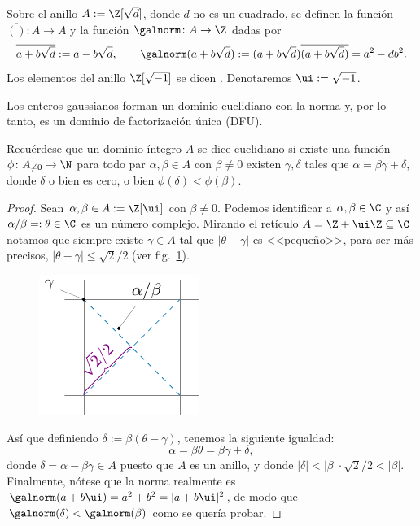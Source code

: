 \documentclass[11pt, reqno]{amsart}
\begin{document}
\begin{mydef}
	Sobre el anillo $A := \Z[\sqrt{d}]$, donde $d$ no es un cuadrado, se definen la función  $\overline{()} \colon A \to A$
	y la función  $\galnorm\colon A \to \Z$ dadas por
	\[
		\overline{a + b\sqrt{d}} := a - b\sqrt{d}, \qquad \galnorm(a + b\sqrt{d}) := (a + b\sqrt{d}) \overline{(a + b\sqrt{d})} = a^2 - db^2.
	\]
	Los elementos del anillo $\Z[\sqrt{-1}]$ se dicen .
	Denotaremos $\ui := \sqrt{-1}$.
\end{mydef}
\begin{thm}\label{thm:gauss_is_euclid}
	Los enteros gaussianos forman un dominio euclidiano con la norma y, por lo tanto, es un dominio de factorización única (DFU).
\end{thm}
Recuérdese que un dominio íntegro $A$ se dice euclidiano si existe una función $\phi \colon A_{\ne 0} \to \N$ para todo par $\alpha, \beta \in A$
con $\beta \ne 0$ existen $\gamma, \delta$ tales que $\alpha = \beta \gamma + \delta$, donde $\delta$ o bien es cero, o bien $\phi(\delta) < \phi(\beta)$.
\begin{proof}
	Sean $\alpha, \beta \in A := \Z[\ui]$ con $\beta \ne 0$.
	Podemos identificar a $\alpha, \beta \in \C$ y así $\alpha/\beta =: \theta \in \C$ es un número complejo.
	Mirando el retículo $A = \Z + \ui\Z \subseteq \C$ notamos que siempre existe $\gamma \in A$ tal que $|\theta - \gamma|$ es <<pequeño>>,
	para ser más precisos, $|\theta - \gamma| \le \sqrt{2}/2$ (ver fig.~\ref{fig:gauss_int}).
	\begin{figure}[!hbt]
		\centering
		\includegraphics[scale=1]{../gauss_int.pdf}
		\caption{}%
		\label{fig:gauss_int}
	\end{figure}

	Así que definiendo $\delta := \beta(\theta - \gamma)$, tenemos la siguiente igualdad:
	$$ \alpha = \beta \theta = \beta \gamma + \delta, $$
	donde $\delta = \alpha - \beta \gamma \in A$ puesto que $A$ es un anillo, y donde $|\delta| < |\beta|\cdot\sqrt{2}/2 < |\beta|$.
	Finalmente, nótese que la norma realmente es $\galnorm(a + b\ui) = a^2 + b^2 = |a + b\ui|^2$, de modo que $\galnorm(\delta) < \galnorm(\beta)$
	como se quería probar.
\end{proof}
\end{document}
